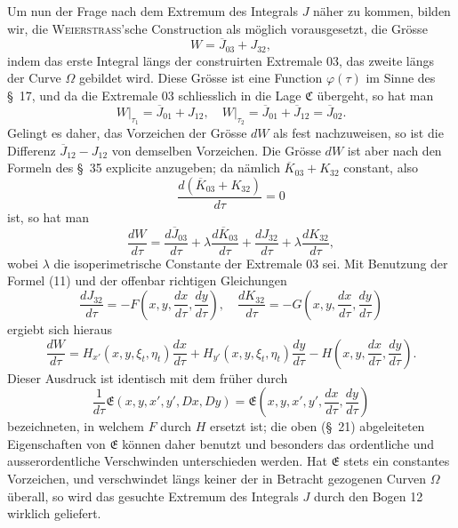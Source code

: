 \documentclass[11pt,a4paper,leqno]{article}
\begin{document}
Um nun der Frage nach dem Extremum des Integrals $J$ näher zu kommen, bilden wir, die \textsc{Weierstrass}'sche Construction als möglich vorausgesetzt, die Grösse
\[
W=\overline{J}_{03}+J_{32},
\]
indem das erste Integral längs der construirten Extremale 03, das zweite längs der Curve $\Omega$ gebildet wird. Diese Grösse ist eine Function $\varphi(\tau)$ im Sinne des \S~17, und da die Extremale 03 schliesslich in die Lage $\mathfrak{C}$ übergeht, so hat man
\[
W\bigg|_{\tau_1}=\overline{J}_{01}+J_{12},
\quad
W\bigg|_{\tau_2}=\overline{J}_{01}+\overline{J}_{12}=\overline{J}_{02}.
\]
Gelingt es daher, das Vorzeichen der Grösse $dW$ als fest nachzuweisen, so ist die Differenz $\overline{J}_{12}-J_{12}$ von demselben Vorzeichen. Die Grösse $dW$ ist aber nach den Formeln des \S~35 explicite anzugeben; da nämlich $\overline{K}_{03}+K_{32}$ constant, also
\[
\frac{d(\overline{K}_{03}+K_{32})}{d\tau}=0
\]
ist, so hat man
\[
\frac{dW}{d\tau}=\frac{d\overline{J}_{03}}{d\tau}+\lambda\frac{d\overline{K}_{03}}{d\tau}
+\frac{dJ_{32}}{d\tau}+\lambda\frac{dK_{32}}{d\tau},
\]
wobei $\lambda$ die isoperimetrische Constante der Extremale 03 sei. Mit Benutzung der Formel (11) und der offenbar richtigen Gleichungen
\[
\frac{dJ_{32}}{d\tau}=-F\left(x,y,\frac{dx}{d\tau},\frac{dy}{d\tau}\right),
\quad
\frac{dK_{32}}{d\tau}=-G\left(x,y,\frac{dx}{d\tau},\frac{dy}{d\tau}\right)
\]
ergiebt sich hieraus
\begin{equation}\tag{14}
\frac{dW}{d\tau}=H_{x'}(x,y,\xi_t,\eta_t)\frac{dx}{d\tau}
+H_{y'}(x,y,\xi_t,\eta_t)\frac{dy}{d\tau}
-H\left(x,y,\frac{dx}{d\tau},\frac{dy}{d\tau}\right).
\end{equation}
Dieser Ausdruck ist identisch mit dem früher durch
\[
\frac{1}{d\tau}\mathfrak{E}(x,y,x',y',Dx,Dy)=
\mathfrak{E}\left(x,y,x',y',\frac{dx}{d\tau},\frac{dy}{d\tau}\right)
\]
bezeichneten, in welchem $F$ durch $H$ ersetzt ist; die oben (\S~21) abgeleiteten Eigenschaften von $\mathfrak{E}$ können daher benutzt und besonders das ordentliche und ausserordentliche Verschwinden unterschieden werden. Hat $\mathfrak{E}$ stets ein constantes Vorzeichen, und verschwindet längs keiner der in Betracht gezogenen Curven $\Omega$ überall, so wird das gesuchte Extremum des Integrals $J$ durch den Bogen 12 wirklich geliefert.
\end{document}
